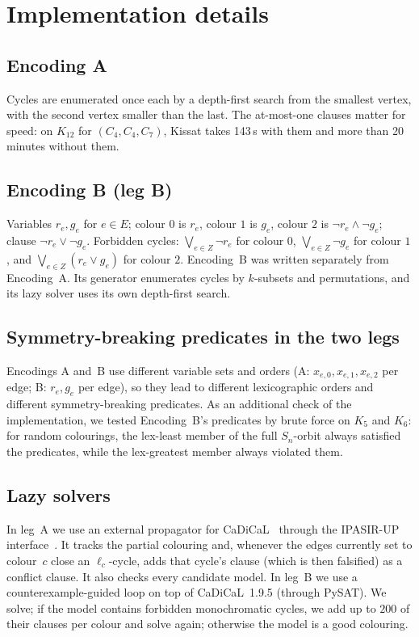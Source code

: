 \documentclass[11pt]{amsart}
\theoremstyle{definition}
\theoremstyle{remark}
\begin{document}
\appendix

\section{Implementation details}\label{app:impl}

\subsection*{Encoding A}
Cycles are enumerated once each by a depth-first search from the smallest vertex, with the second vertex smaller than the last. The
at-most-one clauses matter for speed: on $K_{12}$ for $(C_4,C_4,C_7)$, Kissat takes 143\,s with them and more than 20 minutes without them.

\subsection*{Encoding B (leg B)}
Variables $r_e, g_e$ for $e\in E$; colour $0$ is $r_e$, colour $1$ is $g_e$, colour $2$ is $\neg r_e\wedge\neg g_e$; clause
$\neg r_e\vee\neg g_e$. Forbidden cycles: $\bigvee_{e\in Z}\neg r_e$ for colour $0$, $\bigvee_{e\in Z}\neg g_e$ for colour $1$, and
$\bigvee_{e\in Z}(r_e\vee g_e)$ for colour $2$. Encoding~B was written separately from Encoding~A. Its generator enumerates cycles by
$k$-subsets and permutations, and its lazy solver uses its own depth-first search.

\subsection*{Symmetry-breaking predicates in the two legs}
Encodings A and~B use different variable sets and orders (A: $x_{e,0},x_{e,1},x_{e,2}$ per edge; B: $r_e,g_e$ per edge), so they lead
to different lexicographic orders and different symmetry-breaking predicates. As an additional check of the implementation, we tested
Encoding~B's predicates by brute force on $K_5$ and $K_6$: for random colourings, the lex-least member of the full $S_n$-orbit always
satisfied the predicates, while the lex-greatest member always violated them.

\subsection*{Lazy solvers}
In leg~A we use an external propagator for CaDiCaL~\cite{CaDiCaL2} through the IPASIR-UP interface~\cite{IPASIRUP}. It tracks the
partial colouring and, whenever the edges currently set to colour~$c$ close an $\ell_c$-cycle, adds that cycle's clause (which is then
falsified) as a conflict clause. It also checks every candidate model. In leg~B we use a counterexample-guided loop on top of
CaDiCaL~1.9.5 (through PySAT). We solve; if the model contains forbidden monochromatic cycles, we add up to $200$ of their clauses per
colour and solve again; otherwise the model is a good colouring.
\end{document}
